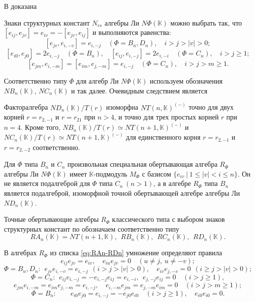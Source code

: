 \documentclass[a4paper,14pt,oneside,openany]{memoir}
\begin{document}
В \cite[лемма 2]{vl90a_ru} доказана

\begin{lemma}\label{l:StructConst-vl90a_ru}
    Знаки структурных констант $N_{rs}$ алгебры Ли $N\Phi(\mathbb{K})$ можно
    выбрать так, что $[e_{ij},e_{jv}]=e_{iv}=-[e_{jv},e_{ij}]$ и выполняются
    равенства:
    \[
        [e_{jv},e_{i,-v}]=e_{i,-j}\quad (\Phi=B_n,D_n),\quad i>j>|v|>0;\]
    \[[e_{i0},e_{j0}]=2e_{i,-j}\quad(\Phi=B_n),\quad
        [e_{ij},e_{i,-j}]=2e_{i,-i}\quad(\Phi=C_n),\quad i>j\geq1;\]
    \[[e_{jm},e_{i,-m}]=[e_{im},e_{j,-m}]=e_{i,-j}\quad(\Phi=C_n),\quad
        i>j>m\geq1.\]
\end{lemma}

Соответственно типу ${\Phi}$ для алгебр Ли $N\Phi(\mathbb{K})$ используем
обозначения $NB_n(\mathbb{K})$, $NC_n(\mathbb{K})$ и так далее. Очевидным
следствием  является

\begin{lemma}\label{l:ReductBnCnDn}
    Факторалгебра $ND_n(\mathbb{K})/T(r)$ изоморфна $NT(n,\mathbb{K})^{(-)}$ точно
    для двух корней $r= r_{2,-1}$ и $r=r_{21}$ при $n>4$, и точно для трех простых
    корней $r$ при $n=4$. Кроме того, $NB_n(\mathbb{K})/T(r) \simeq NT(n+
    1,\mathbb{K})^{(-)}$ и $NC_n(\mathbb{K})/T(r) \simeq NT(n+ 1,\mathbb{K})^{(-)}$
    для единственного корня $r=r_{2,-1}$ и $r=r_{2,-2}$ соответственно.
\end{lemma}

\begin{remark}\label{remark:A3-D3}
    Для ${\Phi}$ типа $B_n$ и $C_n$ произвольная специальная обертывающая алгебра
    $R_{\Phi}$ алгебры Ли $N\Phi(\mathbb{K})$ имеет $\mathbb{K}$-подмодуль $M_\Phi$
    с базисом $\{e_{iv}\ |\ 1 \leq |v| < i \leq n\}$. Он не является подалгеброй
    для ${\Phi}$ типа $C_n\ (n>1)$, а в алгебре $R_{\Phi}$ типа $B_n$ является
    подалгеброй, изоморфной точной обертывающей алгебре алгебры Ли
    $ND_n(\mathbb{K})$.
\end{remark}

Точные обертывающие алгебры $R_{\Phi}$ классического типа с выбором знаков
структурных констант по  обозначаем
соответственно типу
%
\begin{equation}\label{eq:RAn-RDn}
    RA_n(\mathbb{K})=NT(n+1, \mathbb{K}),\ \ RB_n(\mathbb{K}),\ \ RC_n(\mathbb{K}),\ \ RD_n(\mathbb{K}).
\end{equation}
%
\begin{lemma}\label{l:mult-RAn-RDn}
    В алгебрах $R_{\Phi}$ из списка \eqref{eq:RAn-RDn} умножение определяют правила
    \[
        e_{ij}e_{jv}= e_{iv},\quad e_{iu}e_{jv}=0\quad (u\neq j, \ u\neq -v);
    \]
    \[
        \Phi = B_n, D_n:\ \
        e_{jv}e_{i,-v}=e_{i,-j}\ \ (i>j>|v|>0),\quad
        e_{iv}e_{j,-v}=0\ \ (i\geq j>|v|>0);
    \]
    \[
        \Phi=C_n:\ \ e_{ij}e_{i,-j}=-e_{i,-j}e_{ij}=e_{i,-i},\ \ e_{j,-j}e_{ij}=0\quad (i>j\geq 1),
    \]
    \[
        e_{jm}e_{i,-m} = e_{im}e_{j,-m} = e_{i,-j},\quad
        e_{i,-m}e_{jm}=e_{j,-m}e_{im}=0\quad (i>j>m \geq 1);
    \]
    \[
        \Phi = B_n:\qquad e_{i0}e_{j0} = e_{i,-j}=-e_{j0}e_{i0}\quad (i>j\geq 1),\quad e_{i0}e_{i0}=0.
    \]
\end{lemma}
\end{document}
